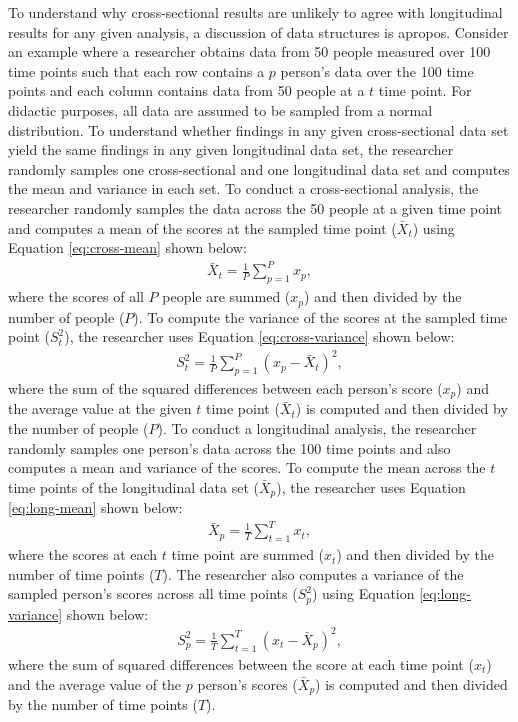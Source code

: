 \documentclass[
12pt, %
twoside,
english]{guelphthesis}
\begin{document}
\label{ergodicity}

To understand why cross-sectional results are unlikely to agree with longitudinal results for any given analysis, a discussion of data structures is apropos. Consider an example where a researcher obtains data from 50 people measured over 100 time points such that each row contains a \(p\) person's data over the 100 time points and each column contains data from 50 people at a \(t\) time point. For didactic purposes, all data are assumed to be sampled from a normal distribution. To understand whether findings in any given cross-sectional data set yield the same findings in any given longitudinal data set, the researcher randomly samples one cross-sectional and one longitudinal data set and computes the mean and variance in each set. To conduct a cross-sectional analysis, the researcher randomly samples the data across the 50 people at a given time point and computes a mean of the scores at the sampled time point (\(\bar{X}_t\)) using Equation \ref{eq:cross-mean} shown below:
\begin{align}
\bar{X}_t = \frac{1}{P}\sum^P_{p = 1} x_p,
\label{eq:cross-mean}
\end{align}
\noindent where the scores of all \(P\) people are summed (\(x_p\)) and then divided by the number of people (\(P\)). To compute the variance of the scores at the sampled time point (\(S^2_t\)), the researcher uses Equation \ref{eq:cross-variance} shown below:
\begin{align}
S^2_t = \frac{1}{P}\sum^P_{p = 1} (x_p - \bar{X}_t)^2,
\label{eq:cross-variance}
\end{align}
\noindent where the sum of the squared differences between each person's score (\(x_p\)) and the average value at the given \(t\) time point (\(\bar{X}_t\)) is computed and then divided by the number of people (\(P\)). To conduct a longitudinal analysis, the researcher randomly samples one person's data across the 100 time points and also computes a mean and variance of the scores. To compute the mean across the \(t\) time points of the longitudinal data set (\(\bar{X}_p\)), the researcher uses Equation \ref{eq:long-mean} shown below:
\begin{align}
\bar{X}_p = \frac{1}{T}\sum^T_{t = 1} x_t,
\label{eq:long-mean}
\end{align}
\noindent where the scores at each \(t\) time point are summed (\(x_t\)) and then divided by the number of time points (\(T\)). The researcher also computes a variance of the sampled person's scores across all time points (\(S^2_p\)) using Equation \ref{eq:long-variance} shown below:
\begin{align}
S^2_p = \frac{1}{T}\sum^T_{t = 1} (x_t - \bar{X}_p)^2,
\label{eq:long-variance}
\end{align}
\noindent where the sum of squared differences between the score at each time point (\(x_t\)) and the average value of the \(p\) person's scores (\(\bar{X}_p\)) is computed and then divided by the number of time points (\(T\)).
\end{document}
